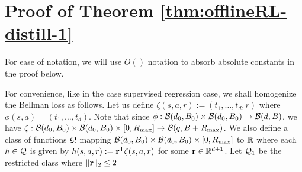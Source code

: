 \section{Proof of Theorem \ref{thm:offlineRL-distill-1}}\label{sec:pfthm2}
For ease of notation, we will use $O()$ notation to absorb absolute constants in the proof below.

For convenience, like in the case supervised regression case, we shall homogenize the Bellman loss as follows. Let us define $\zeta(s,a,r) := (t_1, \dots, t_d, r)$ where $\phi(s,a) = (t_1, \dots, t_d)$. Note that since $\phi : \mathcal{B}(d_0, B_0) \times \mathcal{B}(d_0, B_0) \to \mathcal{B}(d, B)$, we have $\zeta : \mathcal{B}(d_0, B_0) \times \mathcal{B}(d_0, B_0) \times [0, R_{\textnormal{max}}]\to \mathcal{B}(q, B + R_{\textnormal{max}})$. We also define a class of functions $\mathcal{Q}$ mapping $\mathcal{B}(d_0, B_0) \times \mathcal{B}(d_0, B_0) \times [0, R_{\textnormal{max}}]$ to $\mathbb{R}$ where each $h \in \mathcal{Q}$ is given by $h(s,a,r) := {\mathbf{r}}^{\sf T}\zeta(s,a,r)$ for some ${\mathbf{r}} \in \mathbb{R}^{d+1}$. Let $\mathcal{Q}_1$ be the restricted class where $\|{\mathbf{r}}\|_2 \leq 2$

